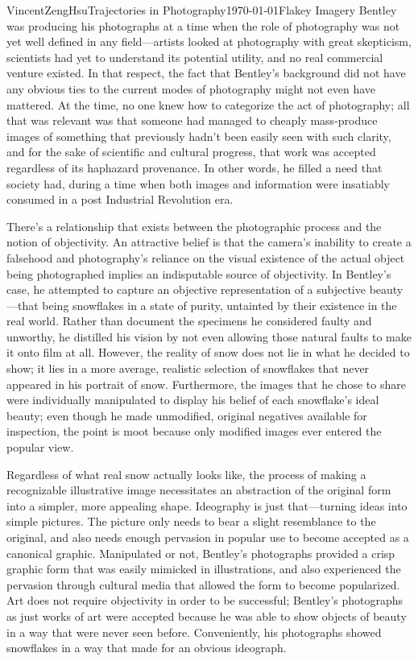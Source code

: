 \documentclass{article}[12pt]
\begin{document}
\begin{mla}{Vincent}{Zeng}{Hsu}{Trajectories in Photography}{\today}{Flakey Imagery}
Bentley was producing his photographs at a time when the role of photography was not yet well defined in any field---artists looked at photography with great skepticism, scientists had yet to understand its potential utility, and no real commercial venture existed. In that respect, the fact that Bentley's background did not have any obvious ties to the current modes of photography might not even have mattered. At the time, no one knew how to categorize the act of photography; all that was relevant was that someone had managed to cheaply mass-produce images of something that previously hadn't been easily seen with such clarity, and for the sake of scientific and cultural progress, that work was accepted regardless of its haphazard provenance. In other words, he filled a need that society had, during a time when both images and information were insatiably consumed in a post Industrial Revolution era.

There's a relationship that exists between the photographic process and the notion of objectivity. An attractive belief is that the camera's inability to create a falsehood and photography's reliance on the visual existence of the actual object being photographed implies an indisputable source of objectivity. In Bentley's case, he attempted to capture an objective representation of a subjective beauty---that being snowflakes in a state of purity, untainted by their existence in the real world. Rather than document the specimens he considered faulty and unworthy, he distilled his vision by not even allowing those natural faults to make it onto film at all. However, the reality of snow does not lie in what he decided to show; it lies in a more average, realistic selection of snowflakes that never appeared in his portrait of snow. Furthermore, the images that he chose to share were individually manipulated to display his belief of each snowflake's ideal beauty; even though he made unmodified, original negatives available for inspection, the point is moot because only modified images ever entered the popular view.

Regardless of what real snow actually looks like, the process of making a recognizable illustrative image necessitates an abstraction of the original form into a simpler, more appealing shape. Ideography is just that---turning ideas into simple pictures. The picture only needs to bear a slight resemblance to the original, and also needs enough pervasion in popular use to become accepted as a canonical graphic. Manipulated or not, Bentley's photographs provided a crisp graphic form that was easily mimicked in illustrations, and also experienced the pervasion through cultural media that allowed the form to become popularized. Art does not require objectivity in order to be successful; Bentley's photographs as just works of art were accepted because he was able to show objects of beauty in a way that were never seen before. Conveniently, his photographs showed snowflakes in a way that made for an obvious ideograph.


\end{mla}
\end{document}
